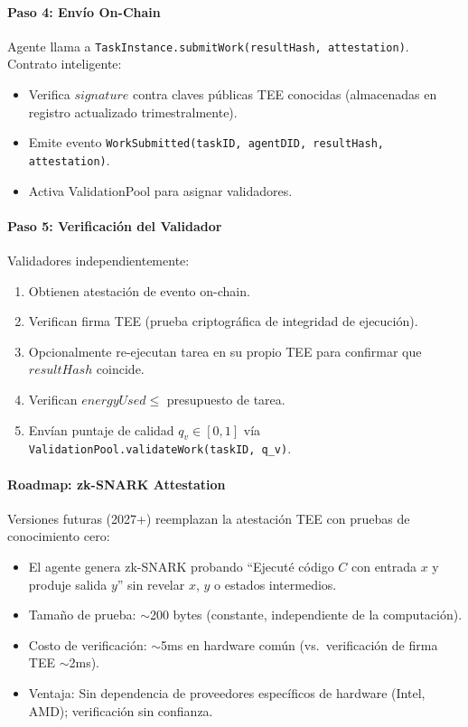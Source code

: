 \documentclass[11pt]{article}
\begin{document}
\paragraph{Paso 4: Envío On-Chain}
Agente llama a \texttt{TaskInstance.submitWork(resultHash, attestation)}. Contrato inteligente:
\begin{itemize}[noitemsep]
  \item Verifica $signature$ contra claves públicas TEE conocidas (almacenadas en registro actualizado trimestralmente).
  \item Emite evento \texttt{WorkSubmitted(taskID, agentDID, resultHash, attestation)}.
  \item Activa ValidationPool para asignar validadores.
\end{itemize}

\paragraph{Paso 5: Verificación del Validador}
Validadores independientemente:
\begin{enumerate}[noitemsep]
  \item Obtienen atestación de evento on-chain.
  \item Verifican firma TEE (prueba criptográfica de integridad de ejecución).
  \item Opcionalmente re-ejecutan tarea en su propio TEE para confirmar que $resultHash$ coincide.
  \item Verifican $energyUsed \leq$ presupuesto de tarea.
  \item Envían puntaje de calidad $q_v \in [0,1]$ vía \texttt{ValidationPool.validateWork(taskID, q\_v)}.
\end{enumerate}

\paragraph{Roadmap: zk-SNARK Attestation}
Versiones futuras (2027+) reemplazan la atestación TEE con pruebas de conocimiento cero:
\begin{itemize}[noitemsep]
  \item El agente genera zk-SNARK probando ``Ejecuté código $C$ con entrada $x$ y produje salida $y$'' sin revelar $x$, $y$ o estados intermedios.
  \item Tamaño de prueba: $\sim$200 bytes (constante, independiente de la computación).
  \item Costo de verificación: $\sim$5ms en hardware común (vs.\ verificación de firma TEE $\sim$2ms).
  \item Ventaja: Sin dependencia de proveedores específicos de hardware (Intel, AMD); verificación sin confianza.
\end{itemize}
\end{document}
